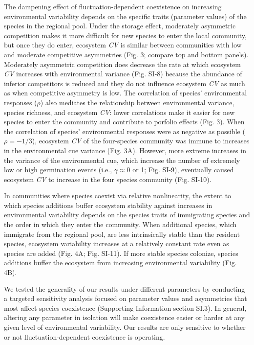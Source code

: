 \documentclass[12pt,]{article}
\begin{document}
The dampening effect of fluctuation-dependent coexistence on increasing
environmental variability depends on the specific traits (parameter
values) of the species in the regional pool. Under the storage effect,
moderately asymmetric competition makes it more difficult for new
species to enter the local community, but once they do enter, ecosystem
\emph{CV} is similar between communities with low and moderate
competitive asymmetries (Fig. 3; compare top and bottom panels).
Moderately asymmetric competition does decrease the rate at which
ecosystem \emph{CV} increases with environmental variance (Fig. SI-8)
because the abundance of inferior competitors is reduced and they do not
influence ecosystem \emph{CV} as much as when competitive asymmetry is
low. The correlation of species' environmental responses (\(\rho\)) also
mediates the relationship between environmental variance, species
richness, and ecosystem \emph{CV}: lower correlations make it easier for
new species to enter the community and contribute to porfolio effects
(Fig. 3). When the correlation of species' environmental responses were
as negative as possible (\(\rho = -1/3\)), ecosystem \emph{CV} of the
four-species community was immune to increases in the environmental cue
variance (Fig. 3A). However, more extreme increases in the variance of
the environmental cue, which increase the number of extremely low or
high germination events (i.e., \(\gamma \approx 0\) or 1; Fig. SI-9),
eventually caused ecosystem \emph{CV} to increase in the four species
community (Fig. SI-10).

In communities where species coexist via relative nonlinearity, the
extent to which species additions buffer ecosystem stability against
increases in environmental variability depends on the species traits of
immigrating species and the order in which they enter the community.
When additional species, which immigrate from the regional pool, are
less intrinsically stable than the resident species, ecosystem
variability increases at a relatively constant rate even as species are
added (Fig. 4A; Fig. SI-11). If more stable species colonize, species
additions buffer the ecosystem from increasing environmental variability
(Fig. 4B).

We tested the generality of our results under different parameters by
conducting a targeted sensitivity analysis focused on parameter values
and asymmetries that most affect species coexistence (Supporting
Information section SI.3). In general, altering any parameter in
isolation will make coexistence easier or harder at any given level of
environmental variability. Our results are only sensitive to whether or
not fluctuation-dependent coexistence is operating.
\end{document}

